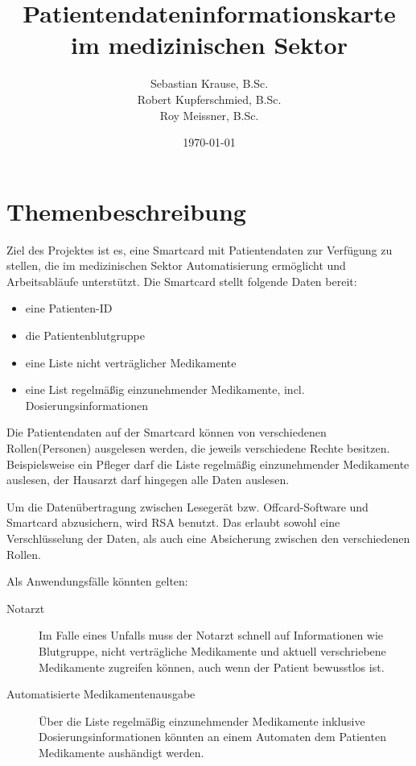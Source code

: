 \documentclass[parskip]{scrartcl}
\begin{document}
	\subject{Projektdokumentation im Fach Smartcard-Programmierung}
	\title{Patientendateninformationskarte im medizinischen Sektor}
	\author{Sebastian Krause, B.Sc.\\Robert Kupferschmied, B.Sc.\\Roy Meissner, B.Sc.}
	\date{\today}
	
	\maketitle
	\vspace{\fill}
	\tableofcontents
	\newpage
	
	\section{Themenbeschreibung}
		Ziel des Projektes ist es, eine Smartcard mit Patientendaten zur Verfügung zu stellen, die im medizinischen Sektor Automatisierung ermöglicht und Arbeitsabläufe unterstützt. Die Smartcard stellt folgende Daten bereit:

		\begin{itemize}
			\item eine Patienten-ID
			\item die Patientenblutgruppe
			\item eine Liste nicht verträglicher Medikamente
			\item eine List regelmäßig einzunehmender Medikamente, incl. Dosierungsinformationen
		\end{itemize}
			
		Die Patientendaten auf der Smartcard können von verschiedenen Rollen(Personen) ausgelesen werden, die jeweils verschiedene Rechte besitzen. Beispielsweise ein Pfleger darf die Liste regelmäßig einzunehmender Medikamente auslesen, der Hausarzt darf hingegen alle Daten auslesen.
		
		Um die Datenübertragung zwischen Lesegerät bzw. Offcard-Software und Smartcard abzusichern, wird RSA benutzt. Das erlaubt sowohl eine Verschlüsselung der Daten, als auch eine Absicherung zwischen den verschiedenen Rollen. 
		
		Als Anwendungsfälle könnten gelten:
	
		\begin{description}
			\item[Notarzt] Im Falle eines Unfalls muss der Notarzt schnell auf Informationen wie Blutgruppe, nicht verträgliche Medikamente und aktuell verschriebene Medikamente zugreifen können, auch wenn der Patient bewusstlos ist. 
			\item[Automatisierte Medikamentenausgabe] Über die Liste regelmäßig einzunehmender Medikamente inklusive Dosierungsinformationen könnten an einem Automaten dem Patienten Medikamente aushändigt werden.
		\end{description}
	
\end{document}
